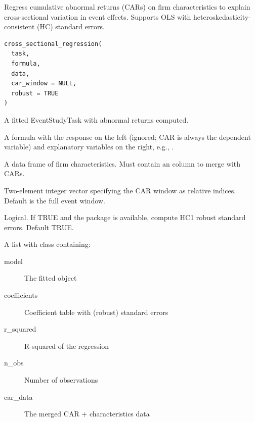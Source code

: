 \documentclass[a4paper]{book}
\begin{document}
%
\begin{Description}
Regress cumulative abnormal returns (CARs) on firm characteristics to
explain cross-sectional variation in event effects. Supports OLS with
heteroskedasticity-consistent (HC) standard errors.
\end{Description}
%
\begin{Usage}
\begin{verbatim}
cross_sectional_regression(
  task,
  formula,
  data,
  car_window = NULL,
  robust = TRUE
)
\end{verbatim}
\end{Usage}
%
\begin{Arguments}
\begin{ldescription}
\item[\code{task}] A fitted EventStudyTask with abnormal returns computed.

\item[\code{formula}] A formula with the response on the left (ignored; CAR is
always the dependent variable) and explanatory variables on the right,
e.g., .

\item[\code{data}] A data frame of firm characteristics. Must contain an
 column to merge with CARs.

\item[\code{car\_window}] Two-element integer vector specifying the CAR window
as  relative indices. Default is the full event window.

\item[\code{robust}] Logical. If TRUE and the  package is available,
compute HC1 robust standard errors. Default TRUE.
\end{ldescription}
\end{Arguments}
%
\begin{Value}
A list with class  containing:
\begin{description}

\item[model] The fitted  object
\item[coefficients] Coefficient table with (robust) standard errors
\item[r\_squared] R-squared of the regression
\item[n\_obs] Number of observations
\item[car\_data] The merged CAR + characteristics data

\end{description}

\end{Value}
\end{document}
